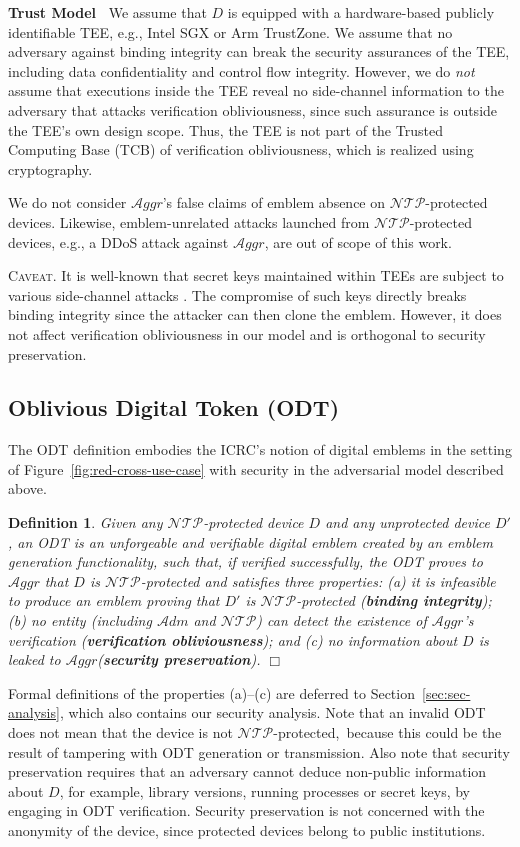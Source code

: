 \documentclass[letterpaper,twocolumn,10pt]{article}
\newcommand{\T}{\ensuremath{\mathcal{A}ggr}\xspace}
\newcommand{\N}{\ensuremath{\mathcal{N\!T}\mathcal{\!P}}\xspace}
\newcommand{\ADM}{\ensuremath{\mathcal{A}dm}\xspace}
\newcommand{\dn}{\ensuremath{D}\xspace}
\newcommand{\da}{\ensuremath{D'}\xspace}
\newtheorem{definition}{Definition}
\newcommand{\mypara}[1]{\vspace{.5em}\noindent\textbf{{#1}~}}
\begin{document}
\mypara{Trust Model}
We assume that \dn is equipped with a hardware-based publicly identifiable TEE, e.g., Intel SGX or Arm TrustZone.
We assume that no adversary against binding integrity can break the security assurances of the TEE,
including data confidentiality and control flow integrity.
However, we do \emph{not} assume that executions inside the TEE reveal no side-channel information to the adversary
that attacks verification obliviousness, since such assurance is outside the TEE's own design scope.
Thus, the TEE is not part of the Trusted Computing Base (TCB) of verification obliviousness, which is realized
using cryptography.

We do not consider \T's false claims of emblem absence on \N-protected devices.
Likewise, emblem-unrelated attacks launched from \N-protected devices, e.g., a DDoS attack against \T,
are out of scope of this work.

\noindent\textsc{Caveat.} It is well-known that secret keys maintained within TEEs are subject to
various side-channel attacks \cite{ragab2021crosstalk,sgxpectre2019,oleksenko2018varys}. The compromise of such keys
directly breaks binding integrity since the attacker can then clone the emblem. However, it does not affect
verification obliviousness in our model and is orthogonal to security preservation.

\subsection{Oblivious Digital Token (ODT)}
\label{sec:def}
The ODT definition embodies the ICRC's notion of digital emblems in the setting of
Figure~\ref{fig:red-cross-use-case} with security in the adversarial model described above.
%
\begin{definition} 
Given any \N-protected device \dn and any unprotected device \da, an ODT is an unforgeable
and verifiable digital emblem created by an emblem generation functionality, such that, if verified successfully,
the ODT proves to \T that \dn is \N-protected and satisfies three properties: (a) it is infeasible to produce an emblem
proving that \da is \N-protected (\textbf{binding integrity}); (b) no entity (including \ADM and \N) can detect the
existence of \T's verification (\textbf{verification obliviousness}); and (c) no information about \dn is leaked
to \T (\textbf{security preservation}).
$\Box$
\end{definition}
%

Formal definitions of the properties (a)--(c) are deferred to Section~\ref{sec:sec-analysis}, which also
contains our security analysis. Note that an invalid ODT does not mean that the device is not \N-protected,\
because this could be the result of  tampering with ODT generation or transmission.
Also note that security preservation requires that an adversary cannot deduce non-public information about
\dn, for example, library versions, running processes or secret keys, by engaging in ODT verification.
Security preservation is not concerned with the anonymity of the device, since protected devices
belong to public institutions.
\end{document}
